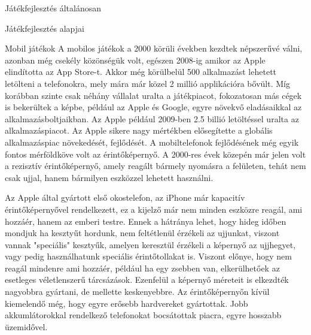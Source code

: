 \begin{MyChapter}{Játékfejlesztés általánosan}
\begin{MySection}{Játékfejlesztés alapjai}
		\begin{MySubSection}{Mobil játékok}
		A mobilos játékok a 2000 körüli években kezdtek népszerűvé válni, azonban még csekély közönségük volt, egészen 2008-ig amikor az Apple elindította az App Store-t. Akkor még körülbelül 500 alkalmazást lehetett letölteni a telefonokra, mely mára már közel 2 millió applikációra bővült. Míg korábban szinte csak néhány vállalat uralta a játékpiacot, fokozatosan más cégek is bekerültek a képbe, például az Apple és Google, egyre növekvő eladásaikkal az alkalmazásboltjaikban. Az Apple például 2009-ben 2.5 billió letöltéssel uralta az alkalmazáspiacot. Az Apple sikere nagy mértékben elősegítette a globális alkalmazáspiac növekedését, fejlődését.
		A mobiltelefonok fejlődésének még egyik fontos mérföldköve volt az érintőképernyő. A 2000-res évek közepén már jelen volt a rezisztív érintőképernyő, amely reagált bármely nyomásra a felületen, tehát nem csak ujjal, hanem bármilyen eszközzel lehetett használni.
		
		Az Apple által gyártott első okostelefon, az iPhone már kapacitív érintőképernyővel rendelkezett, ez a kijelző már nem minden eszközre reagál, ami hozzáér, hanem az emberi testre. Ennek a hátránya lehet, hogy hideg időben mondjuk ha kesztyűt hordunk, nem feltétlenül érzékeli az ujjunkat, viszont vannak "speciális" kesztyűk, amelyen keresztül érzékeli a képernyő az ujjhegyet, vagy pedig használhatunk speciális érintőtollakat is. 
		Viszont előnye, hogy nem reagál mindenre ami hozzáér, például ha egy zsebben van, elkerülhetőek az esetleges véletlenszerű tárcsázások.
		Ezenfelül a képernyő méreteit is elkezdték nagyobbra gyártani, de mellette keskenyebbre. Az érintőképernyőn kívül kiemelendő még, hogy egyre erősebb hardvereket gyártottak. Jobb akkumlátorokkal rendelkező telefonokat bocsátottak piacra, egyre hosszabb üzemidővel.
		

\end{MySubSection}
\end{MySection}
\end{MyChapter}
